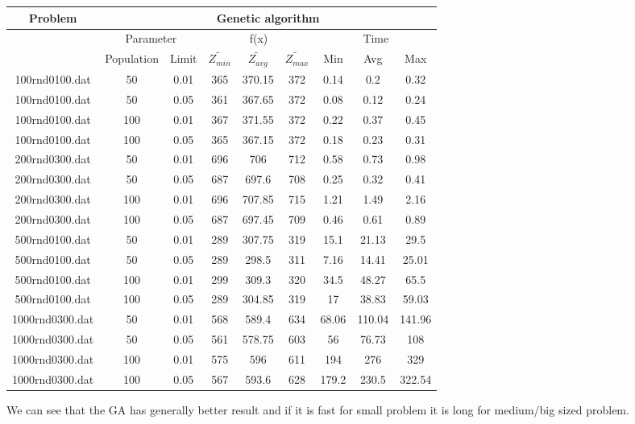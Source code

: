 \documentclass[12pt]{article}
\begin{document}
	\begin{center}
		\begin{tabular}{|c|c|c|c|c|c|c|c|c|}
			\hline
			Problem & \multicolumn{8}{|c|}{Genetic algorithm} \\
			\hline
			 & \multicolumn{2}{|c|}{Parameter} & \multicolumn{3}{|c|}{f(x)} & \multicolumn{3}{|c|}{Time}   \\
			\hline
			& Population & Limit  & $\tilde{Z_{min }}$ & $\tilde{Z_{avg}}$ & $\tilde{Z_{max}}$ & Min & Avg & Max\\
			\hline
			100rnd0100.dat & 50  & 0.01 
			& 365 & 370.15 & 372 & 0.14 & 0.2 & 0.32 \\
			\hline
			100rnd0100.dat & 50  & 0.05
			& 361 & 367.65 & 372 &0.08 &0.12 & 0.24 \\
			\hline
			100rnd0100.dat & 100 & 0.01 
			& 367 & 371.55 & 372 & 0.22& 0.37 & 0.45 \\
			\hline
			100rnd0100.dat & 100 & 0.05 
			& 365 & 367.15 & 372 & 0.18 &  0.23 & 0.31\\
			\hline
			200rnd0300.dat & 50  & 0.01 
			&  696& 706 & 712 & 0.58 &0.73& 0.98 \\
			\hline
			200rnd0300.dat & 50  & 0.05
			& 687 & 697.6 & 708 & 0.25 & 0.32 & 0.41
			\\
			\hline
			200rnd0300.dat & 100 & 0.01
			& 696 & 707.85 & 715 & 1.21 &1.49 & 2.16\\
			\hline
			200rnd0300.dat & 100 & 0.05
			& 687 & 697.45 & 709 & 0.46 & 0.61 & 0.89
			\\
			\hline
			500rnd0100.dat & 50  & 0.01 &
			289 & 307.75 & 319 & 15.1 & 21.13 & 29.5
			\\
			\hline
			500rnd0100.dat & 50  & 0.05
			& 289& 298.5& 311& 7.16& 14.41 & 25.01
			\\
			\hline
			500rnd0100.dat & 100 & 0.01
			& 299 & 309.3 & 320 & 34.5 & 48.27 & 65.5
			\\
			\hline
			500rnd0100.dat & 100 & 0.05 & 289 & 304.85 & 319 & 17 & 38.83 & 59.03
			\\
			\hline
			1000rnd0300.dat & 50  & 0.01 & 568 & 589.4 & 634 & 68.06 & 110.04 & 141.96
			\\
			\hline
			1000rnd0300.dat & 50  & 0.05 & 561 & 578.75 & 603 & 56 & 76.73 & 108 
			\\
			\hline
			1000rnd0300.dat & 100 & 0.01 & 575 & 596 &611 & 194& 276 & 329
			\\
			\hline
			1000rnd0300.dat & 100 & 0.05 & 567 & 593.6 & 628 & 179.2 & 230.5 & 322.54 
			\\
			\hline
		\end{tabular}
	\end{center}
	We can see that the GA has generally better result and if it is fast for small problem it is long for medium/big sized problem. 
	
\end{document}

